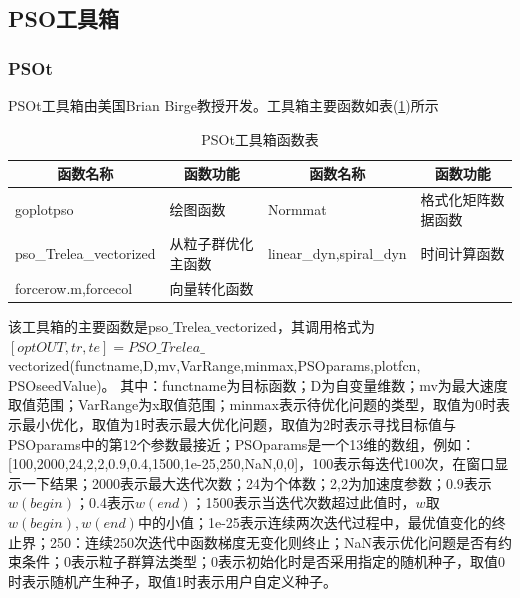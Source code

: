     \subsection{PSO工具箱}
        \subsubsection{PSOt}
            \par
            PSOt工具箱由美国Brian Birge教授开发。工具箱主要函数如表(\ref{tab:PSOt工具箱函数表})所示
        \begin{table}[H]
        \caption{PSOt工具箱函数表}
        \label{tab:PSOt工具箱函数表}
        \begin{tabularx}{\textwidth}{|X|X||X|X|}
        \hline
        \multicolumn{1}{|c}{函数名称} & \multicolumn{1}{|c||}{函数功能} & \multicolumn{1}{c|}{函数名称} & \multicolumn{1}{c|}{函数功能}\\
        \hline
        goplotpso & 绘图函数 & Normmat & 格式化矩阵数据函数\\
        \hline
        pso\_Trelea\_vectorized & 从粒子群优化主函数 & linear\_dyn,spiral\_dyn & 时间计算函数\\
        \hline
        forcerow.m,forcecol & 向量转化函数 & {} & {} \\
        \hline
        \end{tabularx}
        \end{table}
            该工具箱的主要函数是pso$\_$Trelea$\_$vectorized，其调用格式为\\
            $[optOUT,tr,te]=PSO\_Trelea\_$vectorized(functname,D,mv,VarRange,minmax,PSOparams,plotfcn,\\PSOseedValue)。
            其中：functname为目标函数；D为自变量维数；mv为最大速度取值范围；VarRange为x取值范围；minmax表示待优化问题的类型，取值为0时表示最小优化，取值为1时表示最大优化问题，取值为2时表示寻找目标值与PSOparams中的第12个参数最接近；PSOparams是一个13维的数组，例如：[100,2000,24,2,2,0.9,0.4,1500,1e-25,250,NaN,0,0]，100表示每迭代100次，在窗口显示一下结果；2000表示最大迭代次数；24为个体数；2,2为加速度参数；0.9表示$w(begin)$；0.4表示$w(end)$；1500表示当迭代次数超过此值时，$w$取$w(begin),w(end)$中的小值；1e-25表示连续两次迭代过程中，最优值变化的终止界；250：连续250次迭代中函数梯度无变化则终止；NaN表示优化问题是否有约束条件；0表示粒子群算法类型；0表示初始化时是否采用指定的随机种子，取值0时表示随机产生种子，取值1时表示用户自定义种子。

